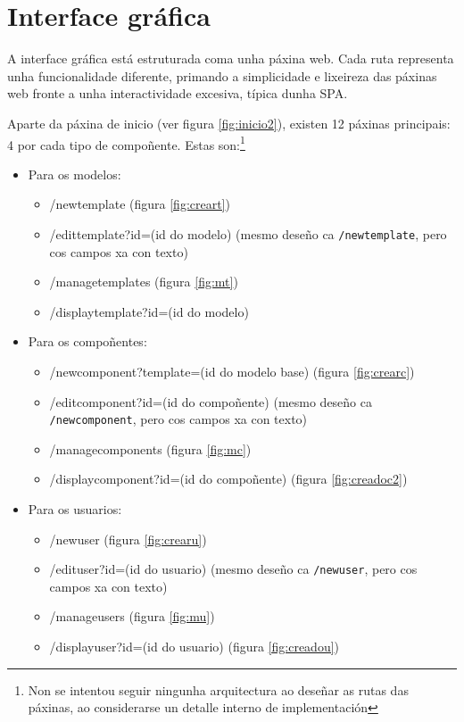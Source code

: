 \chapter{Interface gráfica}
\label{chap:gui}

A interface gráfica está estruturada coma unha páxina web. Cada ruta representa unha funcionalidade diferente, primando a simplicidade e lixeireza das páxinas web fronte a unha interactividade excesiva, típica dunha \acrshort{SPA}.

Aparte da páxina de inicio (ver figura \ref{fig:inicio2}), existen 12 páxinas principais: 4 por cada tipo de compoñente. Estas son:\footnote{Non se intentou seguir ningunha arquitectura ao deseñar as rutas das páxinas, ao considerarse un detalle interno de implementación}

\begin{itemize}
	\item Para os modelos:
	\begin{itemize}
		\item /newtemplate (figura \ref{fig:creart})
		\item /edittemplate?id=(id do modelo) (mesmo deseño ca \texttt{/newtemplate}, pero cos campos xa con texto)
		\item /managetemplates (figura \ref{fig:mt})
		\item /displaytemplate?id=(id do modelo)
	\end{itemize}
	\item Para os compoñentes:
	\begin{itemize}
		\item /newcomponent?template=(id do modelo base) (figura \ref{fig:crearc})
		\item /editcomponent?id=(id do compoñente) (mesmo deseño ca \texttt{/newcomponent}, pero cos campos xa con texto)
		\item /managecomponents (figura \ref{fig:mc})
		\item /displaycomponent?id=(id do compoñente) (figura \ref{fig:creadoc2})
	\end{itemize}
	\item Para os usuarios:
	\begin{itemize}
		\item /newuser (figura \ref{fig:crearu})
		\item /edituser?id=(id do usuario) (mesmo deseño ca \texttt{/newuser}, pero cos campos xa con texto)
		\item /manageusers (figura \ref{fig:mu})
		\item /displayuser?id=(id do usuario) (figura \ref{fig:creadou})
	\end{itemize}
\end{itemize}

